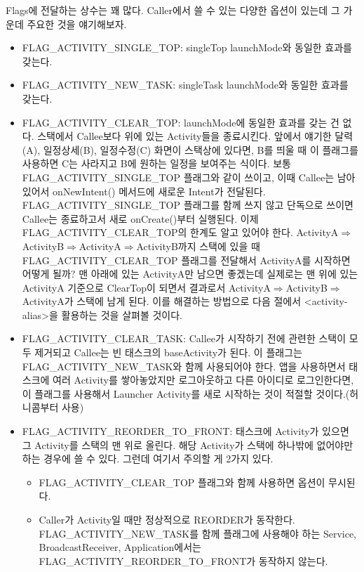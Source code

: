 Flags에 전달하는 상수는 꽤 많다. Caller에서 쓸 수 있는 다양한 옵션이 있는데 그 가운데 주요한 것을 얘기해보자.
\begin{itemize}
\item FLAG\_ACTIVITY\_SINGLE\_TOP: singleTop launchMode와 동일한 효과를 갖는다.
\item FLAG\_ACTIVITY\_NEW\_TASK: singleTask launchMode와 동일한 효과를 갖는다.

\item FLAG\_ACTIVITY\_CLEAR\_TOP: launchMode에 동일한 효과를 갖는 건 없다. 스택에서 Callee보다 위에 있는 Activity들을 종료시킨다. 앞에서 얘기한 달력(A), 일정상세(B), 일정수정(C) 화면이 스택상에 있다면, B를 띄울 때 이 플래그를 사용하면 C는 사라지고 B에 원하는 일정을 보여주는 식이다. 보통 FLAG\_ACTIVITY\_SINGLE\_TOP 플래그와 같이 쓰이고, 이때 Callee는 남아있어서 onNewIntent() 메서드에 새로운 Intent가 전달된다. FLAG\_ACTIVITY\_SINGLE\_TOP 플래그를 함께 쓰지 않고 단독으로 쓰이면 Callee는 종료하고서 새로 onCreate()부터 실행된다.
이제 FLAG\_ACTIVITY\_CLEAR\_TOP의 한계도 알고 있어야 한다. ActivityA$\Rightarrow$ActivityB$\Rightarrow$ActivityA$\Rightarrow$ActivityB까지 스택에 있을 때 FLAG\_ACTI\-VITY\_CLEAR\_TOP 플래그를 전달해서 ActivityA를 시작하면 어떻게 될까? 맨 아래에 있는 ActivityA만 남으면 좋겠는데 실제로는 맨 위에 있는 ActivityA 기준으로 ClearTop이 되면서 결과로서 ActivityA$\Rightarrow$ActivityB$\Rightarrow$ActivityA가 스택에 남게 된다. 이를 해결하는 방법으로 다음 절에서 <activity-alias>을 활용하는 것을 살펴볼 것이다. 

\item FLAG\_ACTIVITY\_CLEAR\_TASK: Callee가 시작하기 전에 관련한 스택이 모두 제거되고 Callee는 빈 태스크의 baseActivity가 된다. 이 플래그는 FLAG\_ACTIVITY\_NEW\_TASK와 함께 사용되어야 한다. 앱을 사용하면서 태스크에 여러 Activity를 쌓아놓았지만 로그아웃하고 다른 아이디로 로그인한다면, 이 플래그를 사용해서 Launcher Activity를 새로 시작하는 것이 적절할 것이다.(허니콤부터 사용)
\item FLAG\_ACTIVITY\_REORDER\_TO\_FRONT: 태스크에 Activity가 있으면 그 Activity를 스택의 맨 위로 올린다. 해당 Activity가 스택에 하나밖에 없어야만 하는 경우에 쓸 수 있다.
그런데 여기서 주의할 게 2가지 있다. 
\begin{itemize}
\item FLAG\_ACTIVITY\_CLEAR\_TOP 플래그와 함께 사용하면 옵션이 무시된다. 
\item Caller가 Activity일 때만 정상적으로 REORDER가 동작한다. FLAG\_ACTIVITY\_NEW\_TASK를 함께 플래그에 사용해야 하는 Service, BroadcastReceiver, Application에서는 FLAG\_ACTIVITY\_RE\-ORDER\_TO\_FRONT가 동작하지 않는다.
\end{itemize}
\end{itemize}

